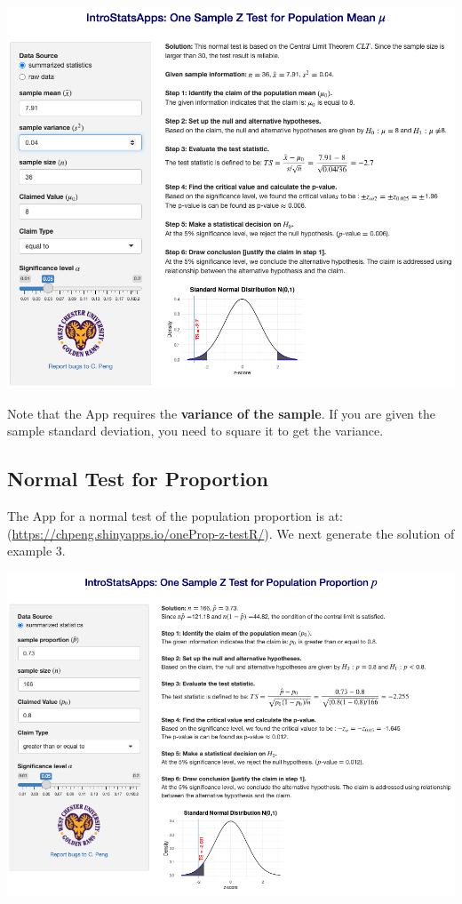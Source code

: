 \documentclass[
]{book}
\begin{document}
\begin{center}\includegraphics[width=1\linewidth]{week09/technology01} \end{center}

Note that the App requires the \textbf{variance of the sample}. If you are given the sample standard deviation, you need to square it to get the variance.

\hfill\break

\hypertarget{normal-test-for-proportion}{%
\subsection{Normal Test for Proportion}\label{normal-test-for-proportion}}

The App for a normal test of the population proportion is at: (\url{https://chpeng.shinyapps.io/oneProp-z-testR/}). We next generate the solution of example 3.

\begin{center}\includegraphics[width=1\linewidth]{week09/technology02} \end{center}
\end{document}
